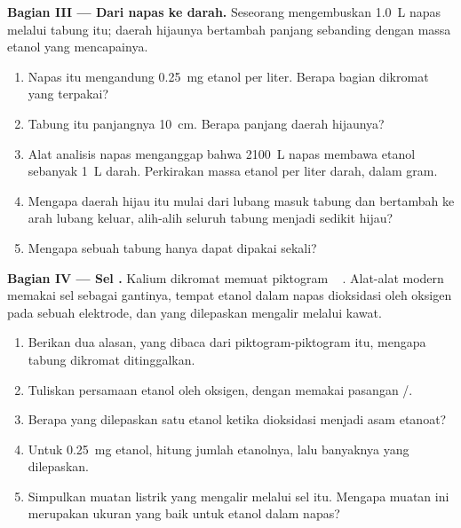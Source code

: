 \begin{problem}
\medskip
\noindent\textbf{Bagian III --- Dari napas ke darah.}
Seseorang mengembuskan \qty{1.0}{L} napas melalui tabung itu; daerah
hijaunya bertambah panjang sebanding dengan massa etanol yang
mencapainya.
\begin{enumerate}[resume]
  \item Napas itu mengandung \qty{0.25}{mg} etanol per liter. Berapa
        bagian dikromat yang terpakai?
  \item Tabung itu panjangnya \qty{10}{cm}. Berapa panjang daerah
        hijaunya?
  \item Alat analisis napas menganggap bahwa \qty{2100}{L} napas
        membawa etanol sebanyak \qty{1}{L} darah. Perkirakan massa etanol
        per liter darah, dalam gram.
  \item Mengapa daerah hijau itu mulai dari lubang masuk tabung dan
        bertambah ke arah lubang keluar, alih-alih seluruh tabung menjadi
        sedikit hijau?
  \item Mengapa sebuah tabung hanya dapat dipakai sekali?
\end{enumerate}

\medskip
\noindent\textbf{Bagian IV --- Sel .}
Kalium dikromat memuat piktogram
\,\,\,\,\,.
Alat-alat modern memakai sel  sebagai gantinya, tempat etanol
dalam napas dioksidasi oleh oksigen pada sebuah elektrode, dan 
yang dilepaskan mengalir melalui kawat.
\begin{enumerate}[resume]
  \item Berikan dua alasan, yang dibaca dari piktogram-piktogram itu,
        mengapa tabung dikromat ditinggalkan.
  \item Tuliskan persamaan  etanol oleh oksigen, dengan memakai
        pasangan /.
  \item Berapa  yang dilepaskan satu  etanol ketika
        dioksidasi menjadi asam etanoat?
  \item Untuk \qty{0.25}{mg} etanol, hitung jumlah etanolnya, lalu
        banyaknya  yang dilepaskan.
  \item Simpulkan muatan listrik yang mengalir melalui sel 
        itu. Mengapa muatan ini merupakan ukuran yang baik untuk etanol
        dalam napas?
\end{enumerate}
\end{problem}
